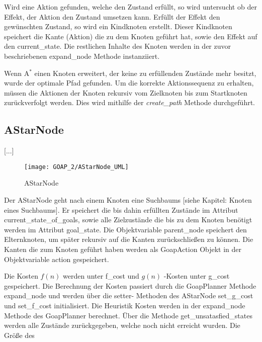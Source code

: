 Wird eine Aktion gefunden, welche den Zustand erfüllt, so wird untersucht ob der Effekt, der Aktion den Zustand umsetzen kann. Erfüllt der Effekt den gewünschten Zustand, so wird ein Kindknoten erstellt. Dieser Kindknoten speichert die Kante (Aktion) die zu dem Knoten geführt hat, sowie den Effekt auf den current\_state. Die restlichen Inhalte des Knoten werden in der zuvor beschriebenen expand\_node Methode instanziiert.



Wenn A$^*$ einen Knoten erweitert, der keine zu erfüllenden Zustände mehr besitzt, wurde der optimale Pfad gefunden. Um die korrekte Aktionssequenz zu erhalten, müssen die Aktionen der Knoten rekursiv vom Zielknoten bis zum Startknoten zurückverfolgt werden. Dies wird mithilfe der \textit{create\_path} Methode durchgeführt.



\subsection{AStarNode}

[...]

\begin{figure}[h]
  \centering
  \texttt{[image: GOAP\_2/AStarNode\_UML]}
	\captionsetup{justification=justified, format=plain}
  \caption{AStarNode}
  \label{AStarNode}
\end{figure}

Der AStarNode geht nach einem Knoten eine Suchbaums [siehe Kapitel: Knoten eines Suchbaums]. Er speichert die bis dahin erfüllten Zustände im Attribut current\_state\_of\_goals, sowie alle Zielzustände die bis zu dem Knoten benötigt werden im Attribut goal\_state. Die Objektvariable parent_node speichert den Elternknoten, um später rekursiv auf die Kanten zurückschließen zu können. Die Kanten die zum Knoten geführt haben werden als GoapAction Objekt in der Objektvariable action gespeichert. 

Die Kosten $f(n)$ werden unter f\_cost und $g(n)$ -Kosten unter g\_cost gespeichert. Die Berechnung der Kosten passiert durch die GoapPlanner Methode expand\_node und werden über die setter- Methoden des AStarNode set\_g\_cost und set\_f\_cost initialisiert. Die Heuristik Kosten werden in der expand\_node Methode des GoapPlanner berechnet. Über die Methode get\_unsatasfied\_states werden alle Zustände zurückgegeben, welche noch nicht erreicht wurden. Die Größe des 




